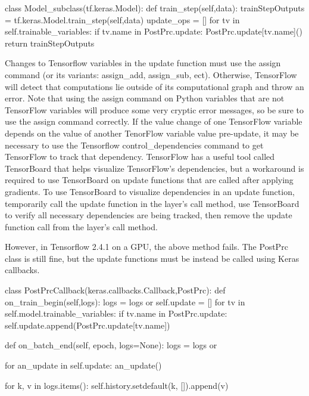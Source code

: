 \begin{code}
class Model_subclass(tf.keras.Model):
    def train_step(self,data):
        trainStepOutputs = tf.keras.Model.train_step(self,data)
        update_ops = []
        for tv in self.trainable_variables:
            if tv.name in PostPrc.update:
                PostPrc.update[tv.name]()
        return trainStepOutputs
\end{code}

Changes to Tensorflow variables in the update function must use the assign command (or its variants: assign\_add, assign\_sub, ect). Otherwise, TensorFlow will detect that computations lie outside of its computational graph and throw an error. Note that using the assign command on Python variables that are not TensorFlow variables will produce some very cryptic error messages, so be sure to use the assign command correctly. If the value change of one TensorFlow variable depends on the value of another TenorFlow variable value pre-update, it may be necessary to use the Tensorflow control\_dependencies command to get TensorFlow to track that dependency. TensorFlow has a useful tool called TensorBoard that helps visualize TensorFlow's dependencies, but a workaround is required to use TensorBoard on update functions that are called after applying gradients. To use TensorBoard to visualize dependencies in an update function, temporarily call the update function in the layer's call method, use TensorBoard to verify all necessary dependencies are being tracked, then remove the update function call from the layer's call method.

However, in Tensorflow 2.4.1 on a GPU, the above method fails. The PostPrc class is still fine, but the update functions must be instead be called using Keras callbacks.
\begin{code}
class PostPrcCallback(keras.callbacks.Callback,PostPrc):
    def on_train_begin(self,logs):
        logs = logs or {}
        self.update = []
        for tv in self.model.trainable_variables:
            if tv.name in PostPrc.update:
                self.update.append(PostPrc.update[tv.name])

    def on_batch_end(self, epoch, logs=None):
        logs = logs or {}

        for an_update in self.update:
            an_update()

        for k, v in logs.items():
            self.history.setdefault(k, []).append(v)
\end{code}

